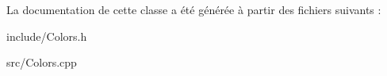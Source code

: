 La documentation de cette classe a été générée à partir des fichiers suivants \+:\begin{DoxyCompactItemize}
\item 
include/Colors.\+h\item 
src/Colors.\+cpp\end{DoxyCompactItemize}
